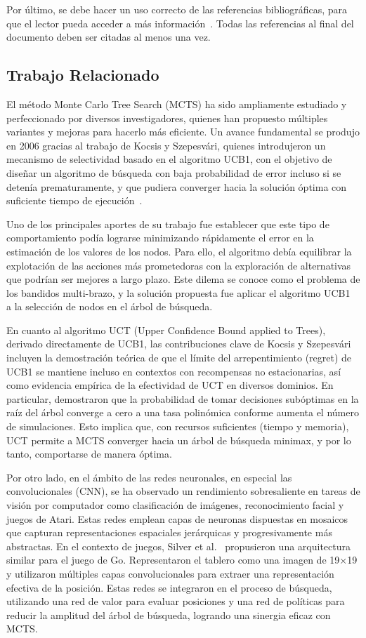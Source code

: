\documentclass[conference,a4paper]{IEEEtran}
\begin{document}
Por último, se debe hacer un uso correcto de las referencias bibliográficas, para que el lector pueda acceder a más información~\cite{b2}. Todas las referencias al final del documento deben ser citadas al menos una vez.

\subsection{Trabajo Relacionado}

El método Monte Carlo Tree Search (MCTS) ha sido ampliamente estudiado y perfeccionado por diversos investigadores, quienes han propuesto múltiples variantes y mejoras para hacerlo más eficiente. Un avance fundamental se produjo en 2006 gracias al trabajo de Kocsis y Szepesvári, quienes introdujeron un mecanismo de selectividad basado en el algoritmo UCB1, con el objetivo de diseñar un algoritmo de búsqueda con baja probabilidad de error incluso si se detenía prematuramente, y que pudiera converger hacia la solución óptima con suficiente tiempo de ejecución~\cite{b2}.

Uno de los principales aportes de su trabajo fue establecer que este tipo de comportamiento podía lograrse minimizando rápidamente el error en la estimación de los valores de los nodos. Para ello, el algoritmo debía equilibrar la explotación de las acciones más prometedoras con la exploración de alternativas que podrían ser mejores a largo plazo. Este dilema se conoce como el problema de los bandidos multi-brazo, y la solución propuesta fue aplicar el algoritmo UCB1~\cite{b3} a la selección de nodos en el árbol de búsqueda.

En cuanto al algoritmo UCT (Upper Confidence Bound applied to Trees), derivado directamente de UCB1, las contribuciones clave de Kocsis y Szepesvári~\cite{b2,b4} incluyen la demostración teórica de que el límite del arrepentimiento (regret) de UCB1 se mantiene incluso en contextos con recompensas no estacionarias, así como evidencia empírica de la efectividad de UCT en diversos dominios. En particular, demostraron que la probabilidad de tomar decisiones subóptimas en la raíz del árbol converge a cero a una tasa polinómica conforme aumenta el número de simulaciones. Esto implica que, con recursos suficientes (tiempo y memoria), UCT permite a MCTS converger hacia un árbol de búsqueda minimax, y por lo tanto, comportarse de manera óptima.

Por otro lado, en el ámbito de las redes neuronales, en especial las convolucionales (CNN), se ha observado un rendimiento sobresaliente en tareas de visión por computador como clasificación de imágenes, reconocimiento facial y juegos de Atari. Estas redes emplean capas de neuronas dispuestas en mosaicos que capturan representaciones espaciales jerárquicas y progresivamente más abstractas. En el contexto de juegos, Silver et al.~\cite{b5} propusieron una arquitectura similar para el juego de Go. Representaron el tablero como una imagen de 19×19 y utilizaron múltiples capas convolucionales para extraer una representación efectiva de la posición. Estas redes se integraron en el proceso de búsqueda, utilizando una red de valor para evaluar posiciones y una red de políticas para reducir la amplitud del árbol de búsqueda, logrando una sinergia eficaz con MCTS.
\end{document}
